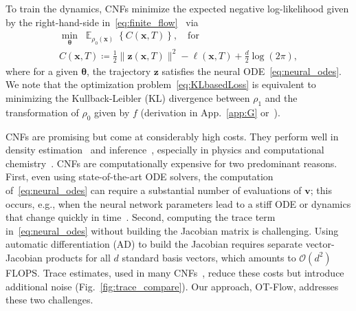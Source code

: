 \documentclass[letterpaper]{article}
\newcommand{\bfth}{\boldsymbol{\theta}}
\newcommand{\bfv}{\mathbf{v}}
\newcommand{\bfx}{\boldsymbol{x}}
\newcommand{\bfz}{\boldsymbol{z}}
\newcommand{\hf}{\frac{1}{2}}
\newcommand{\model}{OT-Flow} %
\newcommand{\E}{\ensuremath{\mathds{E}}}
\newcommand{\bigO}{\ensuremath{\mathcal{O}}}
\begin{document}
	To train the dynamics, CNFs minimize the expected negative log-likelihood given by the right-hand-side in~\eqref{eq:finite_flow}~\cite{rezende2015,papamakarios2017masked,papamakarios2019normalizing,grathwohl2019ffjord} via
	\begin{equation}
		\label{eq:KLbasedLoss}
		\begin{split}
		\min_{\bfth} \;\; \E_{\rho_0(\bfx)} \;  \left\{ C(\bfx,T) \right\} , \quad \text{for} \\
		C(\bfx,T) 
		\coloneqq
		\hf \| \bfz(\bfx,T) \|^2 
		- \ell(\bfx, T) + \frac{d}{2}\log(2 \pi),
		\end{split}
	\end{equation}
	where for a given $\bfth$, the trajectory $\bfz$ satisfies the neural ODE~\eqref{eq:neural_odes}. 
	We note that the optimization problem~\eqref{eq:KLbasedLoss} is equivalent to minimizing the Kullback-Leibler (KL) divergence between $\rho_1$ and the transformation of $\rho_0$ given by $f$ (derivation in App.~\ref{app:G} or~\citealp{papamakarios2019normalizing}).


	CNFs are promising but come at considerably high costs.
	They perform well in density estimation~\cite{chen2017continuous,grathwohl2019ffjord,papamakarios2019normalizing} and inference~\cite{ingraham2018learning,papamakarios2019normalizing}, especially in physics and computational chemistry~\cite{noe2019boltzmann,brehmer2020madminer}.
	CNFs are computationally expensive for two predominant reasons.
	First, even using state-of-the-art ODE solvers, the computation of~\eqref{eq:neural_odes} can require a substantial number of evaluations of $\bfv$; this occurs, e.g., when the neural network parameters lead to a stiff ODE or dynamics that change quickly in time~\cite{ascher2008numerical}.
    Second, computing the trace term in~\eqref{eq:neural_odes} without building the Jacobian matrix is challenging.
    Using automatic differentiation (AD) to build the Jacobian requires separate vector-Jacobian products for all $d$ standard basis vectors, which amounts to $\bigO(d^2)$ FLOPS. Trace estimates, used in many CNFs~\cite{zhang2018monge,grathwohl2019ffjord,finlay2020train}, reduce these costs but introduce additional noise (Fig.~\ref{fig:trace_compare}). Our approach, \model{}, addresses these two challenges.

	
\end{document}
